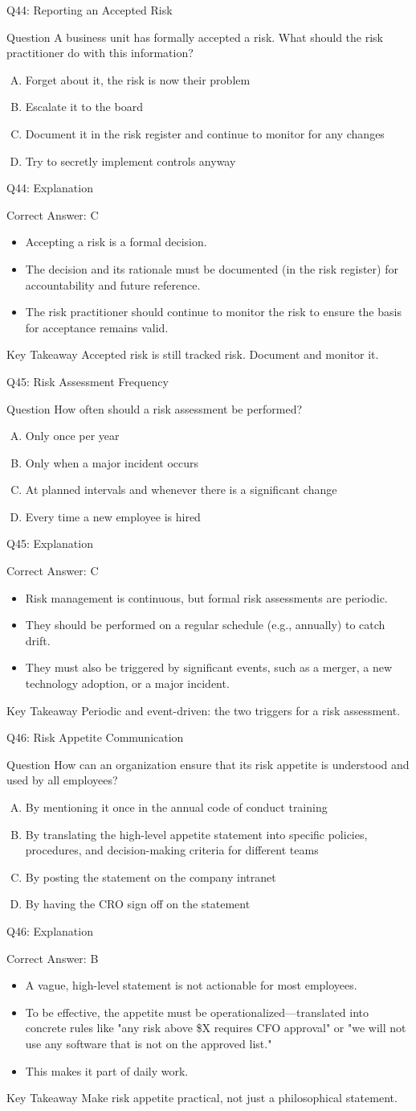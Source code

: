 \documentclass[aspectratio=169]{beamer}
\newcommand{\hq}[7]{%
	\begin{frame}{Q#1: #2}
		\begin{block}{Question}
			#3
		\end{block}
		\begin{enumerate}[(A)]
			#4
		\end{enumerate}
	\end{frame}
	\begin{frame}{Q#1: Explanation}
		\begin{block}{Correct Answer: #5}
			\begin{itemize}
				#6
			\end{itemize}
		\end{block}
		\begin{alertblock}{Key Takeaway}
			#7
		\end{alertblock}
	\end{frame}
}
\begin{document}
	\hq{44}{Reporting an Accepted Risk}
	{A business unit has formally accepted a risk. What should the risk practitioner do with this information?}
	{\item Forget about it, the risk is now their problem
		\item Escalate it to the board
		\item Document it in the risk register and continue to monitor for any changes
		\item Try to secretly implement controls anyway}
	{C}
	{\item Accepting a risk is a formal decision.
		\item The decision and its rationale must be documented (in the risk register) for accountability and future reference.
		\item The risk practitioner should continue to monitor the risk to ensure the basis for acceptance remains valid.}
	{Accepted risk is still tracked risk. Document and monitor it.}
	
	\hq{45}{Risk Assessment Frequency}
	{How often should a risk assessment be performed?}
	{\item Only once per year
		\item Only when a major incident occurs
		\item At planned intervals and whenever there is a significant change
		\item Every time a new employee is hired}
	{C}
	{\item Risk management is continuous, but formal risk assessments are periodic.
		\item They should be performed on a regular schedule (e.g., annually) to catch drift.
		\item They must also be triggered by significant events, such as a merger, a new technology adoption, or a major incident.}
	{Periodic and event-driven: the two triggers for a risk assessment.}
	
	\hq{46}{Risk Appetite Communication}
	{How can an organization ensure that its risk appetite is understood and used by all employees?}
	{\item By mentioning it once in the annual code of conduct training
		\item By translating the high-level appetite statement into specific policies, procedures, and decision-making criteria for different teams
		\item By posting the statement on the company intranet
		\item By having the CRO sign off on the statement}
	{B}
	{\item A vague, high-level statement is not actionable for most employees.
		\item To be effective, the appetite must be operationalized—translated into concrete rules like "any risk above \$X requires CFO approval" or "we will not use any software that is not on the approved list."
		\item This makes it part of daily work.}
	{Make risk appetite practical, not just a philosophical statement.}
	
\end{document}
